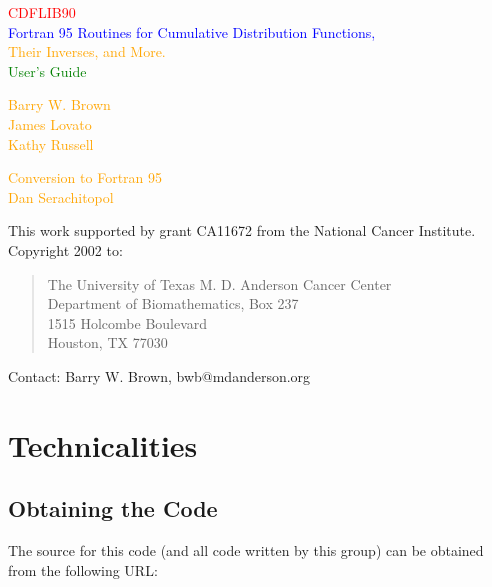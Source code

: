\documentclass[12pt,dvips]{article}
\newcommand{\mysection}[1]{\color{blue}
             \section{#1} \normalcolor}
\newcommand{\mysubsection}[1] {\color{green}
             \subsection{#1} \normalcolor}
\begin{document}

\vspace*{\fill}

{\Large \centering \textcolor {red} {CDFLIB90\\
\textcolor {blue}{Fortran 95 Routines for Cumulative Distribution Functions,}\\
\textcolor {Orange}{Their Inverses, and More.}\\
\textcolor {green} {User's Guide}\\}}

\vspace{0.5in}

{\large \centering \textcolor{Orange}{Barry W. Brown\\
James Lovato\\Kathy Russell\\}}

\vspace{0.5in}

\begin{center}
{\large \textcolor{Orange}{Conversion to Fortran 95\\
Dan Serachitopol\\}}
\end{center}

\vspace{0.5in}

This work supported by grant CA11672 from the National Cancer
Institute.  Copyright 2002 to:\\

\begin{quote}
      The University of Texas M. D. Anderson Cancer Center\\
      Department of Biomathematics, Box 237\\
      1515 Holcombe Boulevard\\
      Houston, TX 77030\\
\end{quote}

\vspace{0.5in}

Contact: Barry W. Brown, bwb@mdanderson.org

\vspace*{\fill}

\pagebreak

\mysection{Technicalities}

\mysubsection{Obtaining the Code}

The source for this code (and all code written by this group) can be
obtained from the following URL:\\
\end{document}
